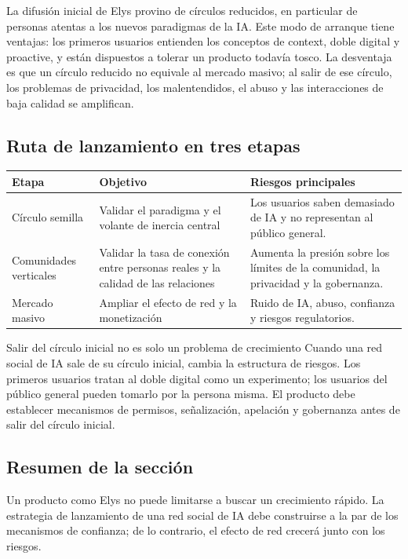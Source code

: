 \documentclass[a4paper]{article}
\begin{document}
La difusión inicial de Elys provino de círculos reducidos, en particular de personas atentas a los nuevos paradigmas de la IA. Este modo de arranque tiene ventajas: los primeros usuarios entienden los conceptos de context, doble digital y proactive, y están dispuestos a tolerar un producto todavía tosco. La desventaja es que un círculo reducido no equivale al mercado masivo; al salir de ese círculo, los problemas de privacidad, los malentendidos, el abuso y las interacciones de baja calidad se amplifican.

\subsection{Ruta de lanzamiento en tres etapas}

\noindent\begin{tabularx}{\textwidth}{p{}p{}X}
\toprule
Etapa & Objetivo & Riesgos principales \\
\midrule
Círculo semilla & Validar el paradigma y el volante de inercia central & Los usuarios saben demasiado de IA y no representan al público general. \\
Comunidades verticales & Validar la tasa de conexión entre personas reales y la calidad de las relaciones & Aumenta la presión sobre los límites de la comunidad, la privacidad y la gobernanza. \\
Mercado masivo & Ampliar el efecto de red y la monetización & Ruido de IA, abuso, confianza y riesgos regulatorios. \\
\bottomrule
\end{tabularx}

\begin{importantbox}{Salir del círculo inicial no es solo un problema de crecimiento}
Cuando una red social de IA sale de su círculo inicial, cambia la estructura de riesgos. Los primeros usuarios tratan al doble digital como un experimento; los usuarios del público general pueden tomarlo por la persona misma. El producto debe establecer mecanismos de permisos, señalización, apelación y gobernanza antes de salir del círculo inicial.
\end{importantbox}

\subsection{Resumen de la sección}

Un producto como Elys no puede limitarse a buscar un crecimiento rápido. La estrategia de lanzamiento de una red social de IA debe construirse a la par de los mecanismos de confianza; de lo contrario, el efecto de red crecerá junto con los riesgos.
\end{document}
